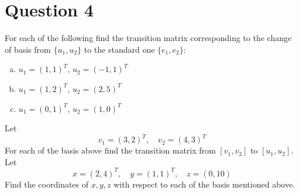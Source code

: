 \documentclass{article}
\begin{document}
\section*{Question 4}
For each of the following find the transition matrix corresponding to the change of basis from $\{u_1, u_2\}$ to the standard one $\{e_1, e_2\}$:
\begin{enumerate}[(a)]
    \item $u_1 = (1,1)^T$, $u_2 = (-1,1)^T$
    \item $u_1 = (1,2)^T$, $u_2 = (2,5)^T$
    \item $u_1 = (0,1)^T$, $u_2 = (1,0)^T$
\end{enumerate}
Let
$$ v_1 = (3,2)^T, \quad v_2 = (4,3)^T $$
For each of the basis above find the transition matrix from $[v_1, v_2]$ to $[u_1, u_2]$.
\newline
Let
$$ x = (2,4)^T, \quad y = (1,1)^T, \quad z = (0,10) $$
Find the coordinates of $x, y, z$ with respect to each of the basis mentioned above.
\end{document}
